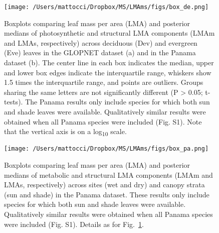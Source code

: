 \documentclass[
  12pt,
  letterpaper,
  DIV=11,
  numbers=noendperiod]{scrartcl}
\begin{document}
\newpage

\begin{figure}

{\centering \texttt{[image: /Users/mattocci/Dropbox/MS/LMAms/figs/box\_de.png]}

}

\caption{\label{fig-box_de}Boxplots comparing leaf mass per area (LMA)
and posterior medians of photosynthetic and structural LMA components
(LMAm and LMAs, respectively) across deciduous (Dev) and evergreen (Eve)
leaves in the GLOPNET dataset (a) and in the Panama dataset (b). The
center line in each box indicates the median, upper and lower box edges
indicate the interquartile range, whiskers show 1.5 times the
interquartile range, and points are outliers. Groups sharing the same
letters are not significantly different (P \textgreater{} 0.05;
t-tests). The Panama results only include species for which both sun and
shade leaves were available. Qualitatively similar results were obtained
when all Panama species were included (Fig. S1). Note that the vertical
axis is on a log\textsubscript{10} scale.}

\end{figure}

\newpage

\begin{figure}

{\centering \texttt{[image: /Users/mattocci/Dropbox/MS/LMAms/figs/box\_pa.png]}

}

\caption{\label{fig-box_pa}Boxplots comparing leaf mass per area (LMA)
and posterior medians of metabolic and structural LMA components (LMAm
and LMAs, respectively) across sites (wet and dry) and canopy strata
(sun and shade) in the Panama dataset. These results only include
species for which both sun and shade leaves were available.
Qualitatively similar results were obtained when all Panama species were
included (Fig. S1). Details as for Fig.~\ref{fig-box_de}.}

\end{figure}

\newpage
\end{document}
